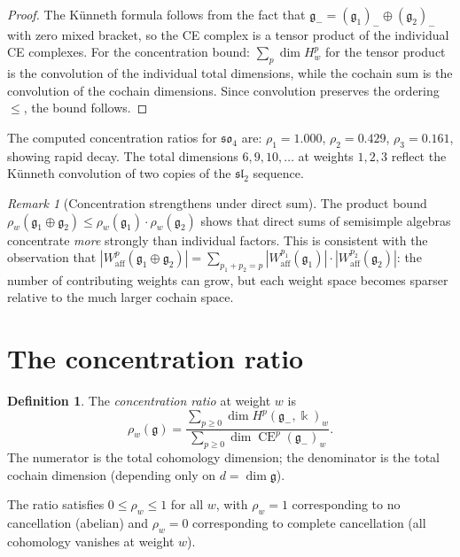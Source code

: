 \documentclass[11pt,reqno]{amsart}
\theoremstyle{plain}
\theoremstyle{definition}
\newtheorem{definition}[theorem]{Definition}
\theoremstyle{remark}
\newtheorem{remark}[theorem]{Remark}
\DeclareMathOperator{\CE}{CE}
\newcommand{\fg}{\mathfrak{g}}
\newcommand{\Waff}{W_{\mathrm{aff}}}
\newcommand{\gminus}{\fg_{-}}
\newcommand{\kk}{\Bbbk}
\begin{document}
\begin{proof}
 The K\"unneth formula follows from the fact that $\gminus = (\fg_1)_-
 \oplus (\fg_2)_-$ with zero mixed bracket, so the CE complex is a
 tensor product of the individual CE complexes. For the concentration
 bound: $\sum_p \dim H^p_w$ for the tensor product is the convolution
 of the individual total dimensions, while the cochain sum is the
 convolution of the cochain dimensions. Since convolution preserves
 the ordering $\le$, the bound follows.
\end{proof}

The computed concentration ratios for $\mathfrak{so}_4$ are:
$\rho_1 = 1.000$, $\rho_2 = 0.429$, $\rho_3 = 0.161$, showing rapid
decay. The total dimensions $6, 9, 10, \ldots$ at weights $1, 2, 3$
reflect the K\"unneth convolution of two copies of the $\mathfrak{sl}_2$
sequence.

\begin{remark}[Concentration strengthens under direct sum]\label{rem:direct-sum}
 The product bound $\rho_w(\fg_1 \oplus \fg_2) \le \rho_w(\fg_1) \cdot
 \rho_w(\fg_2)$ shows that direct sums of semisimple algebras concentrate
 \emph{more} strongly than individual factors. This is consistent with
 the observation that $|\Waff^p(\fg_1 \oplus \fg_2)| = \sum_{p_1 + p_2 = p}
 |\Waff^{p_1}(\fg_1)| \cdot |\Waff^{p_2}(\fg_2)|$: the number of
 contributing weights can grow, but each weight space becomes sparser
 relative to the much larger cochain space.
\end{remark}


\section{The concentration ratio}
\label{sec:ratio}

\begin{definition}\label{def:concentration-ratio}
 The \emph{concentration ratio} at weight $w$ is
 \[
 \rho_w(\fg) = \frac{\sum_{p \ge 0} \dim H^p(\gminus, \kk)_w}
 {\sum_{p \ge 0} \dim \CE^p(\gminus)_w}.
 \]
 The numerator is the total cohomology dimension; the denominator is the
 total cochain dimension (depending only on $d = \dim \fg$).
\end{definition}

The ratio satisfies $0 \le \rho_w \le 1$ for all $w$, with $\rho_w = 1$
corresponding to no cancellation (abelian) and $\rho_w = 0$ corresponding to
complete cancellation (all cohomology vanishes at weight $w$).
\end{document}
